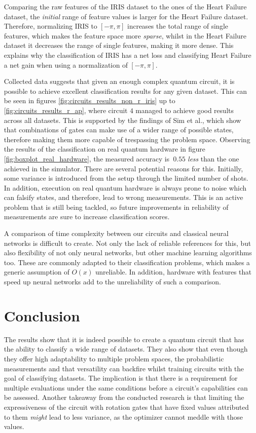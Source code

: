 Comparing the raw features of the IRIS dataset to the ones of the Heart Failure dataset, the \emph{initial} range of feature values is larger for the Heart Failure dataset. Therefore, normalizing IRIS to $[-\pi,\pi]$ increases the total range of single features, which makes the feature space more \emph{sparse}, whilst in the Heart Failure dataset it decreases the range of single features, making it more dense. This explains why the classification of IRIS has a net loss and classifying Heart Failure a net gain when using a normalization of $[-\pi, \pi]$. \par
Collected data suggests that given an enough complex quantum circuit, it is possible to achieve excellent classification results for any given dataset. This can be seen in figures \ref{fig:circuits_results_non_r_iris} up to \ref{fig:circuits_results_r_ap}, where circuit $4$ managed to achieve good results across all datasets. This is supported by the findings of Sim et al.\cite{sim_expressibility_2019}, which show that combinations of gates can make use of a wider range of possible states, therefore making them more capable of trespassing the problem space.
Observing the results of the classification on real quantum hardware in figure \ref{fig:boxplot_real_hardware}, the measured accuracy is $~0.55$ \emph{less} than the one achieved in the simulator. There are several potential reasons for this. Initially, some variance is introduced from the setup through the limited number of shots. In addition, execution on real quantum hardware is always prone to noise which can falsify states, and therefore, lead to wrong measurements. This is an active problem that is still being tackled\cite{georgopoulos_modelling_2021,shaib_efficient_2021}, so future improvements in reliability of measurements are sure to increase classification scores.\par
A comparison of time complexity between our circuits and classical neural networks is difficult to create. Not only the lack of reliable references for this, but also flexibility of not only neural networks, but other machine learning algorithms too. These are commonly adapted to their classification problems, which makes a generic assumption of $O(x)$ unreliable. In addition, hardware with features that speed up neural networks\cite{baischer_learning_2021} add to the unreliability of such a comparison.

\clearpage
\section{Conclusion}
The results show that it is indeed possible to create a quantum circuit that has the ability to classify a wide range of datasets. They also show that even though they offer high adaptability to multiple problem spaces, the probabilistic measurements and that versatility can backfire whilst training circuits with the goal of classifying datasets. The implication is that there is a requirement for multiple evaluations under the same conditions before a circuit's capabilities can be assessed. Another takeaway from the conducted research is that limiting the expressiveness of the circuit with rotation gates that have fixed values attributed to them \emph{might} lead to less variance, as the optimizer cannot meddle with those values.
